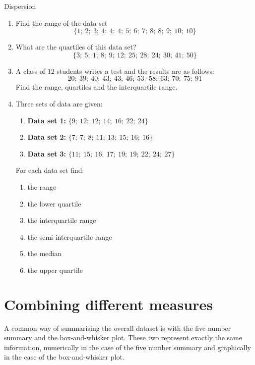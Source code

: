 \begin{exercises}{Dispersion}
  \begin{enumerate}[noitemsep, label=\textbf{\arabic*}.]

  \item Find the range of the data set
    \begin{equation}
      \{1;\ 2;\ 3;\ 4;\ 4;\ 4;\ 5;\ 6;\ 7;\ 8;\ 8;\ 9;\ 10;\ 10\}
    \end{equation}

  \item What are the quartiles of this data set?
    \begin{equation}
      \{3;\ 5;\ 1;\ 8;\ 9;\ 12;\ 25;\ 28;\ 24;\ 30;\ 41;\ 50\}
    \end{equation}

  \item A class of $12$ students writes a test and the results are as
    follows:
    \begin{equation}
      20;\ 39;\ 40;\ 43;\ 43;\ 46;\ 53;\ 58;\ 63;\ 70;\ 75;\ 91
    \end{equation}
    Find the range, quartiles and the interquartile range.

  \item Three sets of data are given:
    \begin{enumerate}
    \item \textbf{Data set 1:} $\{9;\ 12;\ 12;\ 14;\ 16;\ 22;\ 24\}$
    \item \textbf{Data set 2:} $\{7;\ 7;\ 8;\ 11;\ 13;\ 15;\ 16;\ 16\}$
    \item \textbf{Data set 3:} $\{11;\ 15;\ 16;\ 17;\ 19;\ 19;\ 22;\ 24;\ 27\}$
    \end{enumerate}
    For each data set find:
    \begin{enumerate}
    \item the range
    \item the lower quartile
    \item the interquartile range
    \item the semi-interquartile range
    \item the median
    \item the upper quartile
    \end{enumerate}

  \end{enumerate}
\end{exercises}

\section{Combining different measures}
A common way of summarising the overall dataset is with the five
number summary and the box-and-whisker plot. These two represent
exactly the same information, numerically in the case of the five
number summary and graphically in the case of the box-and-whisker
plot.

